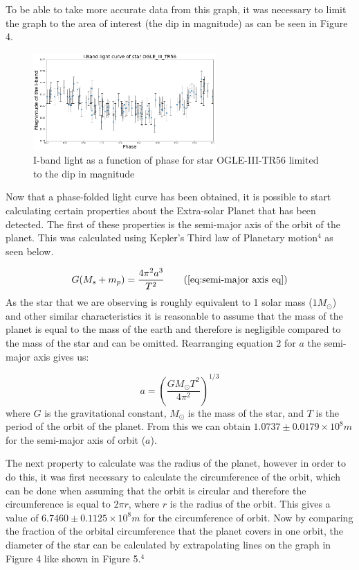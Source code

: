 \documentclass[]{article}
\begin{document}
To be able to take more accurate data from this graph, it
was necessary to limit the graph to the area of interest 
(the dip in magnitude) as can be seen in Figure 4.

\begin{figure}[h]
  \includegraphics[width=7cm]{images/I-band_limit.png}
  \caption{I-band light as a function of phase for star OGLE-III-TR56
  limited to the dip in magnitude}
  \label{fig:HD-_init}
  \end{figure}

Now that a phase-folded light curve has been obtained,
it is possible to start calculating certain properties
about the Extra-solar Planet that has been detected.
The first of these properties is the semi-major axis
of the orbit of the planet. This was calculated using
Kepler's Third law of Planetary motion$^4$ as seen below.

\begin{equation}
  G(M_s+m_p) = \frac{4\pi^2a^3}{T^2} \tag{\ref{eq:semi-major axis eq}}
  \end{equation}
As the star that we are observing is roughly equivalent to 1 
solar mass ($1M_\odot $) and other similar characteristics it is reasonable 
to assume that the mass of the planet is equal to 
the mass of the earth and therefore is negligible compared to 
the mass of the star and can be omitted. 
Rearranging equation 2 for $a$ the semi-major axis
gives us:

\begin{equation}
  a = \left(\frac{GM_{\odot}T^2}{4\pi^2}\right)^{1/3}
  \end{equation}
where $G$ is the gravitational constant, $M_\odot$ is the mass of the star,
and $T$ is the period of the orbit of the planet.
From this we can obtain \newline$1.0737\pm0.0179\times10^{8}m $
for the semi-major axis of orbit ($a$).
\par
The next property to calculate was the radius of the planet,
however in order to do this, it was first necessary to calculate 
the circumference of the orbit, which can be done when assuming 
that the orbit is circular and therefore the circumference is 
equal to $2\pi r $, where $r$ is the radius of the orbit.
This gives a value of $6.7460\pm0.1125 \times10^{8}m $
for the circumference of orbit. Now by comparing the fraction 
of the orbital circumference that the planet covers in one orbit, 
the diameter of the star can be calculated by extrapolating 
lines on the graph in Figure 4 like shown in Figure 5.$^4$ 
\end{document}
